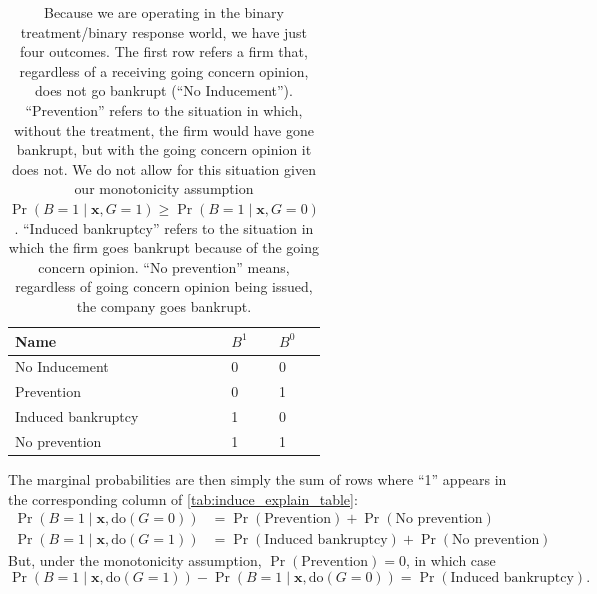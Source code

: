 \documentclass[aoas,preprint, 11pt, dvipsnames, table, x11name]{imsart}
\renewcommand{\bm}[1]{\mathbf{#1}}
\theoremstyle{remark}
\begin{document}
	\begin{table}[h]
		\centering
		\begin{tabular}{lP{1cm}P{1.5cm}}
			
			\toprule
			Name&$B^{1}$&$B^{0}$\\ \midrule
			No Inducement&0&0\\
			Prevention&0&1\\
			Induced bankruptcy&1&0\\
			No prevention&1&1\\
			
			\bottomrule%
		\end{tabular}
		\caption{Because we are operating in the binary treatment/binary response world, we have just four outcomes.  The first row refers a firm that, regardless of a receiving going concern opinion, does not go bankrupt (``No Inducement'').  ``Prevention'' refers to the situation in which, without the treatment, the firm would have gone bankrupt, but with the going concern opinion it does not. We do not allow for this situation given our monotonicity assumption $\Pr(B=1\mid \bm{x}, G=1)\geq \Pr(B=1\mid \bm{x}, G=0)$. ``Induced bankruptcy'' refers to the situation in which the firm goes bankrupt because of the going concern opinion. ``No prevention'' means, regardless of going concern opinion being issued, the company goes bankrupt.}
		\label{tab:induce_explain_table}
	\end{table}
	
	The marginal probabilities are then simply the sum of rows where ``1'' appears in the corresponding column of \autoref{tab:induce_explain_table}:
	\begin{equation}
		\begin{split}
			\Pr(B=1\mid \bm{x}, \text{do}(G=0))&=\Pr(\text{Prevention})+\Pr(\text{No prevention})\\
			\Pr(B=1\mid \bm{x}, \text{do}(G=1))&=\Pr(\text{Induced bankruptcy})+\Pr(\text{No prevention})
		\end{split}
	\end{equation}
	But, under the monotonicity assumption, $\Pr(\text{Prevention}) = 0$, in which case
	\begin{equation}
		\Pr(B=1\mid \bm{x}, \text{do}(G=1))-\Pr(B=1\mid \bm{x}, \text{do}(G=0))=\Pr(\text{Induced  bankruptcy}).
		\label{prevent_eq}
	\end{equation}
	
\end{document}
